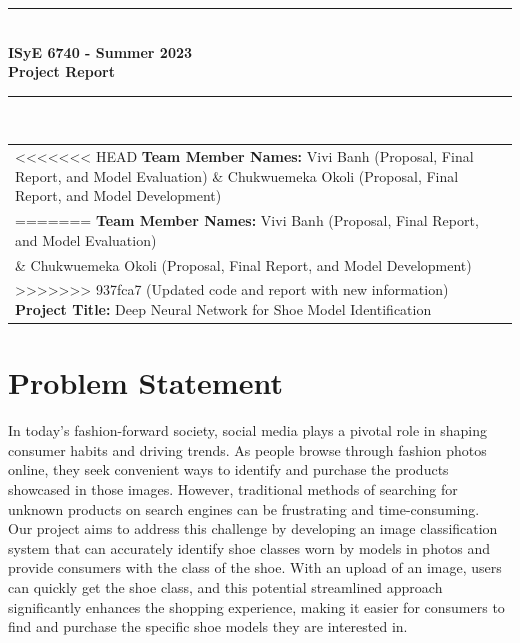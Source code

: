 \documentclass[11pt,a4paper]{article}
\begin{document}

\begin{titlepage}
	\clearpage\thispagestyle{empty}
	\centering
	\vspace{1cm}
		
	\rule{\linewidth}{1mm} \\[0.5cm]
	{ \Large \bfseries ISyE 6740 - Summer 2023\\[0.2cm]
		Project Report}\\[0.5cm]
	\rule{\linewidth}{1mm} \\[1cm]

		\begin{tabular}{l p{5cm}}
<<<<<<< HEAD
		\textbf{Team Member Names:} Vivi Banh (Proposal, Final Report, and Model Evaluation) \& Chukwuemeka Okoli (Proposal, Final Report, and Model Development) \\[10pt]
=======
		\textbf{Team Member Names:} Vivi Banh (Proposal, Final Report, and Model Evaluation) \\ \& Chukwuemeka Okoli (Proposal, Final Report, and Model Development) \\[10pt]
>>>>>>> 937fca7 (Updated code and report with new information)
		\textbf{Project Title:} Deep Neural Network for Shoe Model Identification  \\[10pt]
		\end{tabular} 

\end{titlepage}	
	

\section{Problem Statement}\label{sec1}
In today's fashion-forward society, social media plays a pivotal role in shaping consumer habits and driving trends. As people browse through fashion photos online, they seek convenient ways to identify and purchase the products showcased in those images. However, traditional methods of searching for unknown products on search engines can be frustrating and time-consuming.  \\

\noindent
Our project aims to address this challenge by developing an image classification system that can accurately identify shoe classes worn by models in photos and provide consumers with the class of the shoe. With an upload of an image, users can quickly get the shoe class, and this potential streamlined approach significantly enhances the shopping experience, making it easier for consumers to find and purchase the specific shoe models they are interested in. \\
\end{document}
